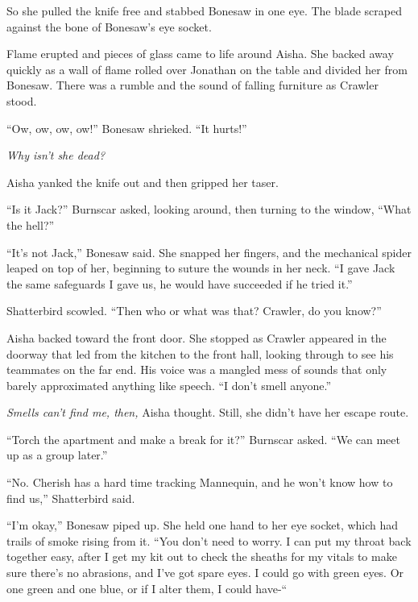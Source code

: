 So she pulled the knife free and stabbed Bonesaw in one eye.  The blade scraped against the bone of Bonesaw's eye socket.



Flame erupted and pieces of glass came to life around Aisha.  She backed away quickly as a wall of flame rolled over Jonathan on the table and divided her from Bonesaw.  There was a rumble and the sound of falling furniture as Crawler stood.



``Ow, ow, ow, ow!''  Bonesaw shrieked.  ``It hurts!''



\emph{Why isn't she dead?}



Aisha yanked the knife out and then gripped her taser.



``Is it Jack?'' Burnscar asked, looking around, then turning to the window, ``What the hell?''



``It's not Jack,'' Bonesaw said.  She snapped her fingers, and the mechanical spider leaped on top of her, beginning to suture the wounds in her neck.  ``I gave Jack the same safeguards I gave us, he would have succeeded if he tried it.''



Shatterbird scowled.  ``Then who or what was that?  Crawler, do you know?''



Aisha backed toward the front door.  She stopped as Crawler appeared in the doorway that led from the kitchen to the front hall, looking through to see his teammates on the far end.  His voice was a mangled mess of sounds that only barely approximated anything like speech.  ``I don't smell anyone.''



\emph{Smells can't find me, then, }Aisha thought.  Still, she didn't have her escape route.



``Torch the apartment and make a break for it?'' Burnscar asked.  ``We can meet up as a group later.''



``No.  Cherish has a hard time tracking Mannequin, and he won't know how to find us,'' Shatterbird said.



``I'm okay,'' Bonesaw piped up.  She held one hand to her eye socket, which had trails of smoke rising from it.  ``You don't need to worry.  I can put my throat back together easy, after I get my kit out to check the sheaths for my vitals to make sure there's no abrasions, and I've got spare eyes.  I could go with green eyes.  Or one green and one blue, or if I alter them, I could have-``



